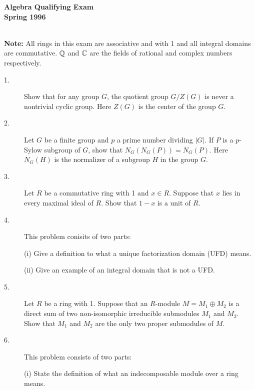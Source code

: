 \documentclass{article}
\begin{document}

\begin{center}\begin{LARGE}
{\bf Algebra Qualifying Exam}\\ 
{\bf Spring 1996}\\ \end{LARGE}
\end{center}
\vspace{0.1in}
\noindent\hrulefill\\

{\bf Note:} All rings in this exam are associative and with 1 and all
integral domains are commutative. $\Bbb Q$ and $\Bbb C$ are the fields
of rational and complex numbers respectively.


\begin{description}

\item[1.]
Show that for any group $G$, the quotient group $G/Z(G)$ is never a
nontrivial cyclic group. Here $Z(G)$ is the center of the group $G$.

\item[2.]
Let $G$ be a finite group and $p$ a prime number dividing $|G|$. If $P$
is a $p$-Sylow subgroup of $G$, show that $N_G (N_G(P)) = N_G(P)$.
Here $N_G (H)$ is the normalizer of a subgroup $H$ in the group $G$.

\item[3.]
Let $R$ be a commutative ring with 1 and $x \in R$. Suppose that $x$ lies
in every maximal ideal of $R$. Show that $1-x$ is a unit of $R$.

\item[4.]
This problem conisits of two parts:

\item[\quad] (i)
Give a definition to what a unique factorization domain (UFD) means.

\item[\quad] (ii)
Give an example of an integral domain that is not a UFD.

\item[5.]
Let $R$ be a ring with 1. Suppose that an $R$-module $M = M_1 \oplus M_2$
is a direct sum of two non-isomorphic irreducible submodules $M_1$ and
$M_2$. Show that $M_1$ and $M_2$ are the only two proper submodules of $M$.

\item[6.]
This problem consists of two parts:

\item[\quad] (i)
State the definition of what an indecomposable module over a ring means.


\end{description}
\end{document}
